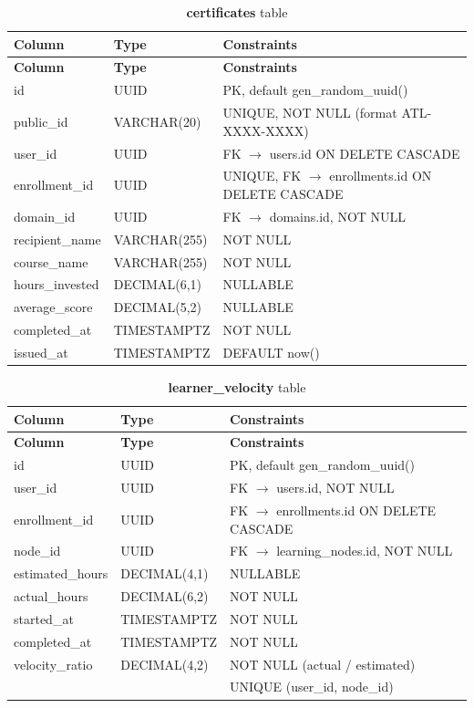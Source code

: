 \begin{longtable}{p{3cm}p{2.5cm}p{5cm}}
\caption{\textbf{certificates} table}
\label{tab:ch04_certificates}\\
\toprule
\textbf{Column} & \textbf{Type} & \textbf{Constraints} \\
\midrule
\endfirsthead
\toprule
\textbf{Column} & \textbf{Type} & \textbf{Constraints} \\
\midrule
\endhead
id & UUID & PK, default gen\_random\_uuid() \\
public\_id & VARCHAR(20) & UNIQUE, NOT NULL (format ATL-XXXX-XXXX) \\
user\_id & UUID & FK $\rightarrow$ users.id ON DELETE CASCADE \\
enrollment\_id & UUID & UNIQUE, FK $\rightarrow$ enrollments.id ON DELETE CASCADE \\
domain\_id & UUID & FK $\rightarrow$ domains.id, NOT NULL \\
recipient\_name & VARCHAR(255) & NOT NULL \\
course\_name & VARCHAR(255) & NOT NULL \\
hours\_invested & DECIMAL(6,1) & NULLABLE \\
average\_score & DECIMAL(5,2) & NULLABLE \\
completed\_at & TIMESTAMPTZ & NOT NULL \\
issued\_at & TIMESTAMPTZ & DEFAULT now() \\
\bottomrule
\end{longtable}

\begin{longtable}{p{3cm}p{2.5cm}p{5cm}}
\caption{\textbf{learner\_velocity} table}
\label{tab:ch04_learner_velocity}\\
\toprule
\textbf{Column} & \textbf{Type} & \textbf{Constraints} \\
\midrule
\endfirsthead
\toprule
\textbf{Column} & \textbf{Type} & \textbf{Constraints} \\
\midrule
\endhead
id & UUID & PK, default gen\_random\_uuid() \\
user\_id & UUID & FK $\rightarrow$ users.id, NOT NULL \\
enrollment\_id & UUID & FK $\rightarrow$ enrollments.id ON DELETE CASCADE \\
node\_id & UUID & FK $\rightarrow$ learning\_nodes.id, NOT NULL \\
estimated\_hours & DECIMAL(4,1) & NULLABLE \\
actual\_hours & DECIMAL(6,2) & NOT NULL \\
started\_at & TIMESTAMPTZ & NOT NULL \\
completed\_at & TIMESTAMPTZ & NOT NULL \\
velocity\_ratio & DECIMAL(4,2) & NOT NULL (actual / estimated) \\
 &  & UNIQUE (user\_id, node\_id) \\
\bottomrule
\end{longtable}

